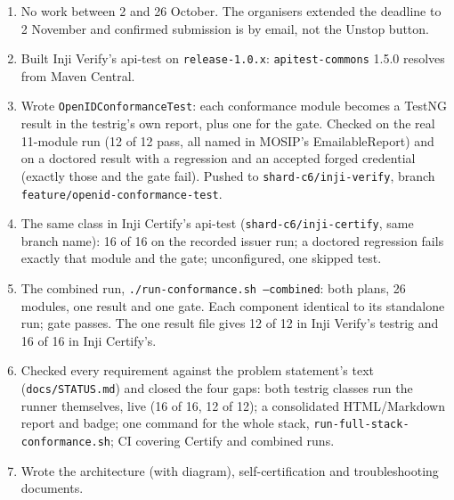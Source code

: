 \documentclass[10pt,a4paper]{article}
\newcommand{\tightlist}{\setlength{\itemsep}{1pt}\setlength{\parskip}{0pt}\setlength{\parsep}{0pt}}
\begin{document}
\begin{enumerate}\tightlist
  \item No work between 2 and 26 October. The organisers extended the deadline to 2 November
        and confirmed submission is by email, not the Unstop button.
  \item Built Inji Verify's api-test on \texttt{release-1.0.x}: \texttt{apitest-commons} 1.5.0
        resolves from Maven Central.
  \item Wrote \texttt{OpenIDConformanceTest}: each conformance module becomes a TestNG result
        in the testrig's own report, plus one for the gate. Checked on the real 11-module run
        (12 of 12 pass, all named in MOSIP's EmailableReport) and on a doctored result with a
        regression and an accepted forged credential (exactly those and the gate fail).
        Pushed to \texttt{shard-c6/inji-verify}, branch \texttt{feature/openid-conformance-test}.
  \item The same class in Inji Certify's api-test (\texttt{shard-c6/inji-certify}, same branch
        name): 16 of 16 on the recorded issuer run; a doctored regression fails exactly that
        module and the gate; unconfigured, one skipped test.
  \item The combined run, \texttt{./run-conformance.sh --combined}: both plans, 26 modules, one
        result and one gate. Each component identical to its standalone run; gate passes. The
        one result file gives 12 of 12 in Inji Verify's testrig and 16 of 16 in Inji Certify's.
  \item Checked every requirement against the problem statement's text (\texttt{docs/STATUS.md})
        and closed the four gaps: both testrig classes run the runner themselves, live (16 of 16,
        12 of 12); a consolidated HTML/Markdown report and badge; one command for the whole stack,
        \texttt{run-full-stack-conformance.sh}; CI covering Certify and combined runs.
  \item Wrote the architecture (with diagram), self-certification and troubleshooting documents.
\end{enumerate}
\end{document}
